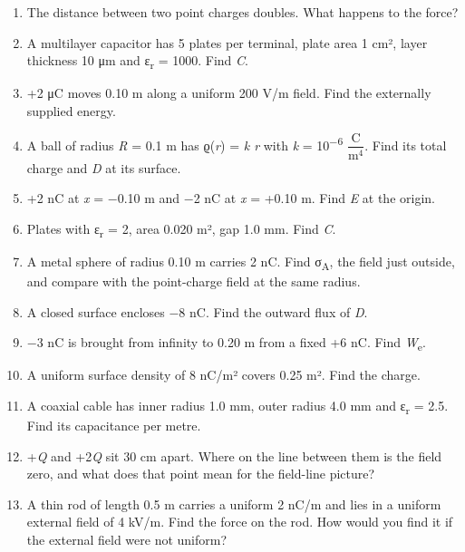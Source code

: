 \documentclass[11pt]{article}
\begin{document}
\begin{keepsection}
\begin{enumerate}
\item The distance between two point charges doubles. What happens to the force?
\item A multilayer capacitor has 5 plates per terminal, plate area 1 cm², layer thickness 10 μm and ε\textsubscript{r} = 1000. Find \textit{C}.
\item +2 μC moves 0.10 m along a uniform 200 V/m field. Find the externally supplied energy.
\item A ball of radius \textit{R} = 0.1 m has ϱ(\textit{r}) = \textit{k r} with \textit{k} = 10\textsuperscript{\ensuremath{-}6} {\small\ensuremath{\dfrac{\mathrm{C}}{\mathrm{m}^{4}}}}. Find its total charge and \textit{D} at its surface.
\item +2 nC at \textit{x} = \ensuremath{-}0.10 m and \ensuremath{-}2 nC at \textit{x} = +0.10 m. Find \textit{E} at the origin.
\item Plates with ε\textsubscript{r} = 2, area 0.020 m², gap 1.0 mm. Find \textit{C}.
\item A metal sphere of radius 0.10 m carries 2 nC. Find σ\textsubscript{A}, the field just outside, and compare with the point-charge field at the same radius.
\item A closed surface encloses \ensuremath{-}8 nC. Find the outward flux of \textit{D}.
\item \ensuremath{-}3 nC is brought from infinity to 0.20 m from a fixed +6 nC. Find \textit{W}\textsubscript{e}.
\item A uniform surface density of 8 nC/m² covers 0.25 m². Find the charge.
\item A coaxial cable has inner radius 1.0 mm, outer radius 4.0 mm and ε\textsubscript{r} = 2.5. Find its capacitance per metre.
\item +\textit{Q} and +2\textit{Q} sit 30 cm apart. Where on the line between them is the field zero, and what does that point mean for the field-line picture?
\item A thin rod of length 0.5 m carries a uniform 2 nC/m and lies in a uniform external field of 4 kV/m. Find the force on the rod. How would you find it if the external field were not uniform?
\end{enumerate}

\end{keepsection}
\end{document}
